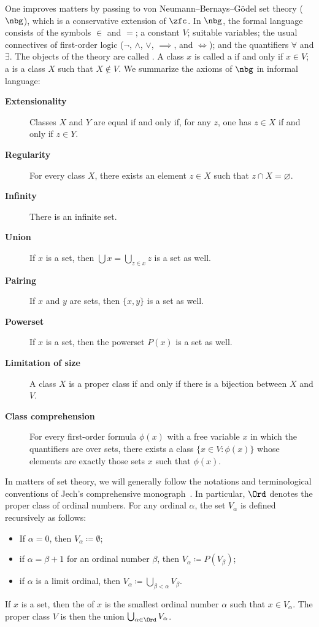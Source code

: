 One improves matters by passing to von Neumann--Bernays--Gödel set theory ($\nbg$),
which is a conservative extension of $\zfc$.
In $ \nbg $, the formal language consists of the symbols $\in$ and $=$;
a constant $V$; suitable variables;
the usual connectives of first-order logic ($\neg$, $\wedge$, $\vee$, $\implies$, and $\iff$);
and the quantifiers $\forall$ and $\exists$.
The objects of the theory are called .
A class $ x $ is called a  if and only if $x \in V$;
a  is a class $ X $ such that $ X \notin V $.
We summarize the axioms of $ \nbg $ in informal language:
\begin{description}
	\item[\textbf{Extensionality}] Classes $ X $ and $ Y $ are equal if and only if,
		for any $ z $, one has $ z \in X $ if and only if $ z \in Y $.
	\item[\textbf{Regularity}] For every class $ X $,
		there exists an element $ z \in X $ such that $ z \cap X = \varnothing $.
	\item[\textbf{Infinity}] There is an infinite set.
	\item[\textbf{Union}] If $ x $ is a set, then $ \bigcup x = \bigcup_{z \in x} z $ is a set as well.
	\item[\textbf{Pairing}] If $ x $ and $ y $ are sets, then $ \{x,y\} $ is a set as well.
	\item[\textbf{Powerset}] If $ x $ is a set, then the powerset $ P(x) $ is a set as well.
	\item[\textbf{Limitation of size}] A class $X$ is a proper class if and only if
		there is a bijection between $X$ and $V$.
	\item[\textbf{Class comprehension}] For every first-order formula $ \phi(x) $ with a free variable $ x $ in which the quantifiers are over sets,
		there exists a class $ \{ x \in V : \phi(x) \} $ whose elements are exactly those sets $ x $ such that $ \phi(x) $.
\end{description}

In matters of set theory,
we will generally follow the notations and terminological conventions
of Jech's comprehensive monograph~\citep{Jech2003}.
In particular, $ \Ord $ denotes the proper class of ordinal numbers.
For any ordinal $ \alpha $, the set $ V_{\alpha} $ is defined recursively as follows:
\begin{itemize}
	\item If $ \alpha = 0 $, then $ V_{\alpha} \coloneq \emptyset $;
	\item if $ \alpha = \beta + 1 $ for an ordinal number $ \beta $, then $ V_{\alpha} \coloneq P(V_{\beta}) $;
	\item if $ \alpha $ is a limit ordinal, then $ V_{\alpha} \coloneq \bigcup_{\beta < \alpha} V_{\beta} $.
\end{itemize}
If $ x $ is a set, then the  of $ x $ is the smallest ordinal number $ \alpha $ such that $ x \in V_{\alpha} $.
The proper class $ V $ is then the union $ \bigcup_{\alpha \in \Ord} V_{\alpha} $.

